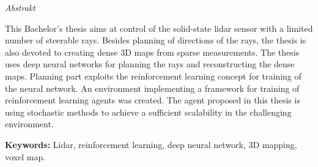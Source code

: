 \vfill
\begin{center}
{\it \large Abstrakt}
\vspace{0.2cm}

\begin{minipage}{0.8\textwidth}{
This Bachelor's thesis aims at control of the solid-state lidar sensor with a limited number of steerable rays. Besides planning of directions of the rays, the thesis is also devoted to creating dense 3D maps from sparse measurements. The thesis uses deep neural networks for planning the rays and reconstructing the dense maps. Planning part exploits the reinforcement learning concept for training of the neural network. An environment implementing a framework for training of reinforcement learning agents was created. The agent proposed in this thesis is using stochastic methods to achieve a sufficient scalability in the challenging environment.
\vspace{3mm}
\par \textbf{Keywords:} Lidar, reinforcement learning, deep neural network, 3D mapping, voxel map.
}
\end{minipage}
\end{center}
\vfill
\vspace{1cm}
\newpage{}
